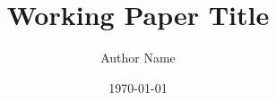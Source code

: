 \documentclass[11pt]{article}
\title{Working Paper Title}
\author{Author Name}
\date{\today}
\begin{document}
\maketitle
\onehalfspacing











\end{document}
